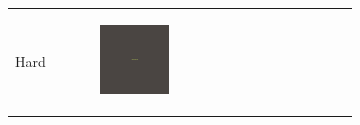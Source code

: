\documentclass[conference]{IEEEtran}
\newlength{\subfigwidth}
\begin{document}
\begin{figure}

    \centering
    \begin{subfigure}[b]{\textwidth}

        \begin{tabular}{r M{\subfigwidth} M{\subfigwidth} M{\subfigwidth} M{\subfigwidth} M{\subfigwidth} }
            Hard                                                                                    &
            \begin{subfigure}[b]{\subfigwidth}
                \includegraphics[width=\textwidth]{figures/growth_comparison_lambda_1e-3/hard.0019.png}
            \end{subfigure} &
            \begin{subfigure}[b]{\subfigwidth}

\end{subfigure}
\end{tabular}
\end{subfigure}
\end{figure}
\end{document}
